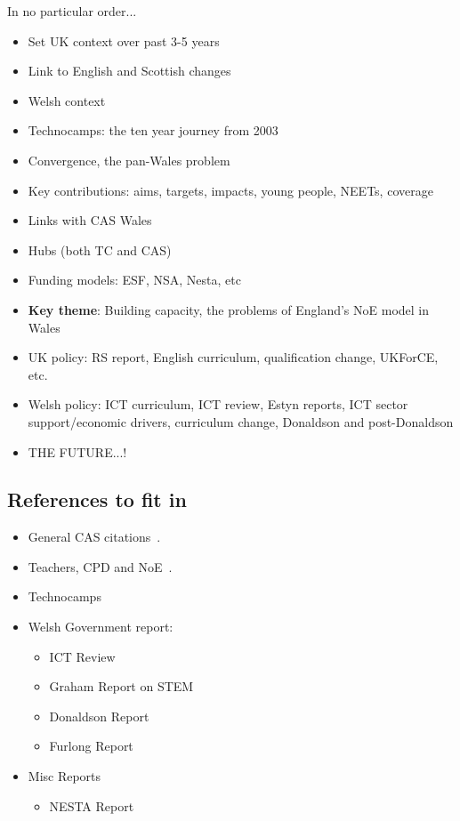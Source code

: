\documentclass{sig-alternate}
\begin{document}
In no particular order...

\begin{itemize}
\item Set UK context over past 3-5 years
\item Link to English and Scottish changes
\item Welsh context
\item Technocamps: the ten year journey from 2003
\item Convergence, the pan-Wales problem
\item Key contributions: aims, targets, impacts, young people, NEETs, coverage
\item Links with CAS Wales
\item Hubs (both TC and CAS)
\item Funding models: ESF, NSA, Nesta, etc
\item {\textbf{Key theme}}: Building capacity, the problems of
  England's NoE model in Wales
\item UK policy: RS report, English curriculum, qualification change,
  UKForCE, etc.
\item Welsh policy: ICT curriculum, ICT review, Estyn reports, ICT
  sector support/economic drivers, curriculum change,
  Donaldson and post-Donaldson
\item THE FUTURE...!
\end{itemize}

\subsection*{References to fit in}
\begin{itemize}
\item
General CAS
citations~\cite{crick+sentance:2011,brown-et-al-sigcse2012,brown-et-al-toce2014}.

\item
Teachers, CPD and
NoE~\cite{sentance-et-al-wipsce2012,sentance-et-al:2013,sentance-et-al:2014}.

\item
Technocamps~\cite{ball-et-al:2012,boyle-et-al:2012}

\item
Welsh Government report:
\begin{itemize}
\item
ICT Review~\cite{welshictreview:2013}
\item
Graham Report on STEM~\cite{STEMreview:2014}
\item
Donaldson Report~\cite{Donaldson:2015}
\item
Furlong Report~\cite{Furlong:2015}
\end{itemize}

\item
Misc Reports
\begin{itemize}
\item
NESTA Report~\cite{NESTA:2015}

\end{itemize}
\end{itemize}
\end{document}
